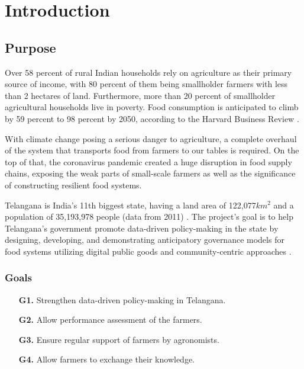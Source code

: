 \chapter{Introduction}

\section{Purpose}



Over 58 percent of rural Indian households rely on agriculture as their primary source of income, with 80 percent of them being smallholder farmers with less than 2 hectares of land. Furthermore, more than 20 percent of smallholder agricultural households live in poverty. Food consumption is anticipated to climb by 59 percent to 98 percent by 2050, according to the Harvard Business Review \cite{global_demand_for_food}.

With climate change posing a serious danger to agriculture, a complete overhaul of the system that transports food from farmers to our tables is required. On the top of that, the coronavirus pandemic created a huge disruption in food supply chains, exposing the weak parts of small-scale farmers as well as the significance of constructing resilient food systems.

Telangana is India's 11th biggest state, having a land area of 122,077$km^2$ and a population of 35,193,978 people (data from 2011) \cite{telangana}. The project's goal is to help Telangana’s government promote data-driven policy-making in the state by designing, developing, and demonstrating anticipatory governance models for food systems utilizing digital public goods and community-centric approaches \cite{reference_doc}.

\subsection{Goals} \label{subsec:goals}
\begin{itemize}
    \item [\textbf{G1.}] Strengthen data-driven policy-making in Telangana.
    \item [\textbf{G2.}] Allow performance assessment of the farmers.
    \item [\textbf{G3.}] Ensure regular support of farmers by agronomists.
    \item [\textbf{G4.}] Allow farmers to exchange their knowledge.
\end{itemize}

